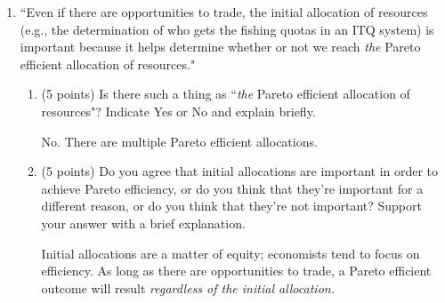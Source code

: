 \documentclass[twoside]{article}
\begin{document}
\begin{enumerate}
\begin{enumerate}
    \item \begin{EXAM} ``Even if there are opportunities to trade, the initial allocation of resources (e.g., the determination of who gets the fishing quotas in an ITQ system) is important because it helps determine whether or not we reach \emph{the} Pareto efficient allocation of resources." \end{EXAM}

        \begin{enumerate}

        \item \begin{EXAM} (5 points) Is there such a thing as ``\emph{the} Pareto efficient allocation of resources"? Indicate Yes or No and explain briefly. \end{EXAM}

\begin{KEY}
No. There are multiple Pareto efficient allocations.
\end{KEY}


        \item \begin{EXAM} (5 points) Do you agree that initial allocations are important in order to achieve Pareto efficiency, or do you think that they're important for a different reason, or do you think that they're not important?  Support your answer with a brief explanation. \end{EXAM}

\begin{KEY}
Initial allocations are a matter of equity; economists tend to focus on efficiency. As long as there are opportunities to trade, a Pareto efficient outcome will result \emph{regardless of the initial allocation.}
\end{KEY}

        \end{enumerate}

    \end{enumerate}












\begin{comment}
\item (Overinvestment as a barrier to entry) Consider the following sequential move games of complete information. The games are between an incumbent monopolist (M) and a potential entrant (PE). You can answer these questions without looking at the stories, but the stories do provide some context and motivation.


\end{comment}
\end{enumerate}
\end{document}
